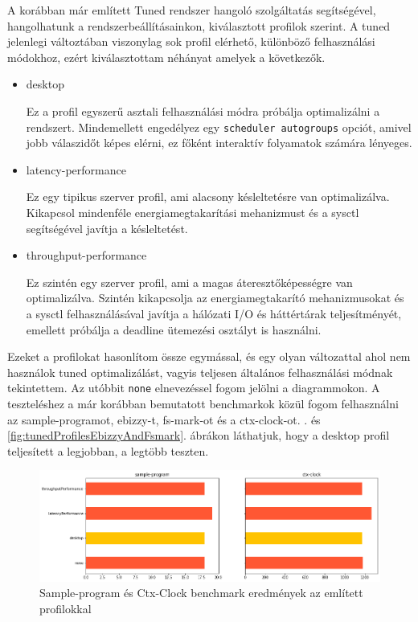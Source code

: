 A korábban már említett Tuned rendszer hangoló szolgáltatás segítségével, hangolhatunk a rendszerbeállításainkon, kiválasztott profilok szerint.
A tuned jelenlegi változtában viszonylag sok profil elérhető, különböző felhasználási módokhoz, ezért kiválasztottam néhányat amelyek a következők.
\begin{itemize}
\item desktop

Ez a profil egyszerű asztali felhasználási módra próbálja optimalizálni a rendszert.
Mindemellett engedélyez egy \texttt{scheduler autogroups} opciót, amivel jobb válaszidőt képes elérni, ez főként interaktív folyamatok számára lényeges.

\item latency-performance

Ez egy tipikus szerver profil, ami alacsony késleltetésre van optimalizálva. Kikapcsol mindenféle energiamegtakarítási mehanizmust és a sysctl segítségével javítja a késleltetést.

\item throughput-performance

Ez szintén egy szerver profil, ami a magas áteresztőképességre van optimalizálva.
Szintén kikapcsolja az energiamegtakarító mehanizmusokat és a sysctl felhasználásával javítja a hálózati I/O és háttértárak teljesítményét, emellett próbálja a deadline ütemezési osztályt is használni.
\end{itemize}

Ezeket a profilokat hasonlítom össze egymással, és egy olyan változattal ahol nem használok tuned optimalizálást, vagyis teljesen általános felhasználási módnak tekintettem.
Az utóbbit \texttt{none} elnevezéssel fogom jelölni a diagrammokon.
A teszteléshez a már korábban bemutatott benchmarkok közül fogom felhasználni az sample-programot, ebizzy-t, fs-mark-ot és a ctx-clock-ot.
. és \ref{fig:tunedProfilesEbizzyAndFsmark}. ábrákon láthatjuk, hogy a desktop profil teljesített a legjobban, a legtöbb teszten.
\begin{figure}[h!]
\centering
\includegraphics[width=\textwidth]{images/sampleProgramAndCtxClock.png}
\caption{Sample-program és Ctx-Clock benchmark eredmények az említett profilokkal}
\label{fig:tunedProfilesSampleprogramAndCtxClock}
\end{figure}

